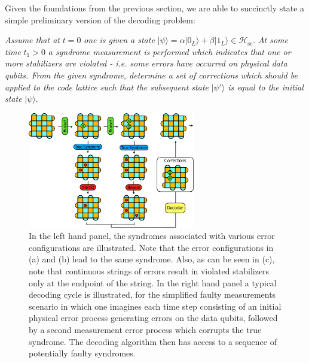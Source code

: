 \documentclass[twocolumn,preprintnumbers,amsmath,amssymb,notitlepage,nofootinbib,longbibliography,superscriptaddress,aps,pra,10pt]{revtex4-1}
\begin{document}
    Given the foundations from the previous section, we are able to succinctly state a simple preliminary version of the decoding problem:\newline

    \noindent\textit{Assume that at} $t=0$  \textit{one is given a state} $|\psi\rangle = \alpha |0_L\rangle + \beta |1_L\rangle \in \mathcal{H}_{\mathrm{sc}}.$ \textit{At some time }$t_1>0$ \textit{a syndrome measurement is performed which indicates that one or more stabilizers are violated - i.e. some errors have occurred on physical data qubits. From the given syndrome, determine a set of corrections which should be applied to the code lattice such that the subsequent state} $|\psi'\rangle$ \textit{is equal to the initial state} $|\psi\rangle.$ \newline

    \begin{figure}
      \centering
      \includegraphics[width=0.65\textwidth]{figures/decoding_problem.pdf}
      \caption{In the left hand panel, the syndromes associated with various error configurations are illustrated. Note that the error configurations in (a) and (b) lead to the same syndrome. Also, as can be seen in (c), note that continuous strings of errors result in violated stabilizers only at the endpoint of the string. In the right hand panel a typical decoding cycle is illustrated, for the simplified faulty measurements scenario in which one imagines each time step consisting of an initial physical error process generating errors on the data qubits, followed by a second measurement error process which corrupts the true syndrome. The decoding algorithm then has access to a sequence of potentially faulty syndromes.}\label{f:decoding_problem}
    \end{figure}
\end{document}
